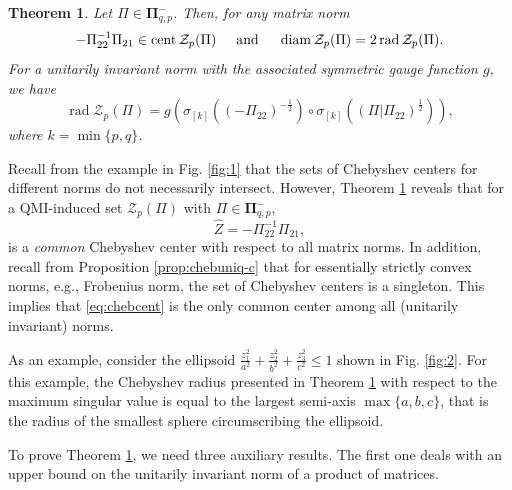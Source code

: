 \documentclass[pdflatex,sn-mathphys-num]{sn-jnl}%
\DeclareMathOperator{\rad}{rad}
\DeclareMathOperator{\cent}{cent}
\DeclareMathOperator{\diam}{diam}
\theoremstyle{thmstyleone}
\newtheorem{theorem}{Theorem}
\begin{document}
\begin{theorem}
\label{th:1}
Let $\Pi\in\pmb{\Pi}_{q,p}^-$. Then, for any matrix norm
\begin{equation}
-\Pi_{22}^{-1} \Pi_{21}\in\cent\mathcal{Z}_{p}(\Pi)\hspace{0.5 cm} \text{and}\hspace{0.5 cm}  \diam\mathcal{Z}_{p}(\Pi)=2\rad \mathcal{Z}_{p}(\Pi).
\end{equation}
For a unitarily invariant norm with the associated symmetric gauge function $g$, we have
\begin{equation}
\rad\mathcal{Z}_{p}(\Pi)=g(\sigma_{[k]}((-\Pi_{22})^{-\frac{1}{2}})\circ \sigma_{[k]}((\Pi|\Pi_{22})^{\frac{1}{2}})),
\end{equation}
where $k=\min\{p,q\}$.
\end{theorem}



Recall from the example in Fig. \ref{fig:1} that the sets of Chebyshev centers for different norms do not necessarily intersect. However, Theorem \ref{th:1} reveals that for a QMI-induced set $\mathcal{Z}_p(\Pi)$ with $\Pi\in\pmb{\Pi}_{q,p}^-$,
\begin{equation}
\label{eq:chebcent}
\hat{Z}=-\Pi_{22}^{-1} \Pi_{21},
\end{equation}
is a \emph{common} Chebyshev center with respect to all matrix norms. In addition, recall from Proposition \ref{prop:chebuniq-c} that for essentially strictly convex norms, e.g., Frobenius norm, the set of Chebyshev centers is a singleton. This implies that \eqref{eq:chebcent} is the only common center among all (unitarily invariant) norms. 


As an example, consider the ellipsoid $\tfrac{z_1^2}{a^2}+\tfrac{z_2^2}{b^2}+\tfrac{z_3^2}{c^2}\leq1$ shown in Fig. \ref{fig:2}. For this example, the Chebyshev radius presented in Theorem \ref{th:1} with respect to the maximum singular value is equal to the largest semi-axis $\max\{a,b,c\}$, that is the radius of the smallest sphere circumscribing the ellipsoid.

To prove Theorem \ref{th:1}, we need three auxiliary results. The first one deals with an upper bound on the unitarily invariant norm of a product of matrices. 
\end{document}
